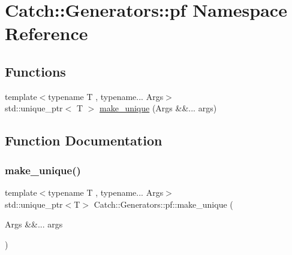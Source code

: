 \hypertarget{namespace_catch_1_1_generators_1_1pf}{}\section{Catch\+::Generators\+::pf Namespace Reference}
\label{namespace_catch_1_1_generators_1_1pf}
\subsection*{Functions}
\begin{DoxyCompactItemize}
\item 
{\footnotesize template$<$typename T , typename... Args$>$ }\\std\+::unique\+\_\+ptr$<$ T $>$ \mbox{\hyperlink{namespace_catch_1_1_generators_1_1pf_adb71cb1098062f6baaf86ec4feadae7d}{make\+\_\+unique}} (Args \&\&... args)
\end{DoxyCompactItemize}


\subsection{Function Documentation}
\mbox{\label{namespace_catch_1_1_generators_1_1pf_adb71cb1098062f6baaf86ec4feadae7d}} 
\subsubsection{\texorpdfstring{make\_unique()}{make\_unique()}}
{\footnotesize\ttfamily template$<$typename T , typename... Args$>$ \\
std\+::unique\+\_\+ptr$<$T$>$ Catch\+::\+Generators\+::pf\+::make\+\_\+unique (\begin{DoxyParamCaption}\item[{Args \&\&...}]{args }\end{DoxyParamCaption})}


